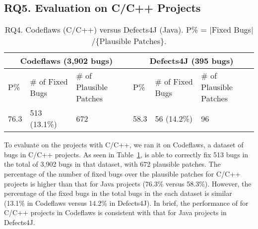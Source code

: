 \subsection{\bf RQ5. Evaluation on C/C++ Projects}
\label{sec:eval-c}

\begin{table}[t]
	\caption{RQ4. Codeflaws (C/C++) versus Defects4J (Java). P\% = $|$Fixed Bugs$|$/\{Plausible Patches\}.}
	\vspace{-5pt}
	{\footnotesize
		\begin{center}
			\tabcolsep 2.7pt
			\begin{tabular}{p{0.5cm}<{\centering}|p{1.5cm}<{\centering}|p{1.55cm}<{\centering}|p{0.5cm}<{\centering}|p{1.5cm}<{\centering}|p{1.55cm}<{\centering}}\hline	
				
				\multicolumn{3}{c|}{Codeflaws (3,902 bugs)} & \multicolumn{3}{c}{Defects4J (395 bugs)}\\\hline
				 P\%& \# of Fixed Bugs& \# of Plausible Patches &P\%& \# of Fixed Bugs & \# of Plausible Patches \\ \hline
				
				  76.3  &        513 (13.1\%)      &            672             &  58.3 &          56 (14.2\%)       &        96                 \\
				\hline

			\end{tabular}
			\label{RQ5}
		\end{center}
	}
\end{table}
  
To evaluate {\tool} on the projects with C/C++, we ran it on
Codeflaws, a dataset of bugs in C/C++ projects.  As seen in
Table~\ref{RQ5}, {\tool} is able to correctly fix 513 bugs in the
total of 3,902 bugs in that dataset, with 672 plausible patches. The
percentage of the number of fixed bugs over the plausible patches for
C/C++ projects is higher than that for Java projects (76.3\% versus
58.3\%). However, the percentage of the fixed bugs in the total bugs
in the each dataset is similar (13.1\% in Codeflaws versus 14.2\% in
Defects4J). In brief, the performance of {\tool} for C/C++ projects in
Codeflaws is consistent with that for Java projects in Defects4J.








